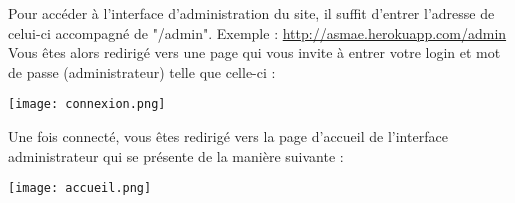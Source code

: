 Pour accéder à l’interface d’administration du site, il suffit d’entrer l’adresse de celui-ci accompagné de "/admin". Exemple : \href{http://asmae.herokuapp.com/admin}{http://asmae.herokuapp.com/admin}\\
Vous êtes alors redirigé vers une page qui vous invite à entrer votre login et mot de passe (administrateur) telle que celle-ci :

\begin{center}
\texttt{[image: connexion.png]}
\end{center}

Une fois connecté, vous êtes redirigé vers la page d'accueil de l'interface administrateur qui se présente de la manière suivante :

\begin{center}
\texttt{[image: accueil.png]}
\end{center}

